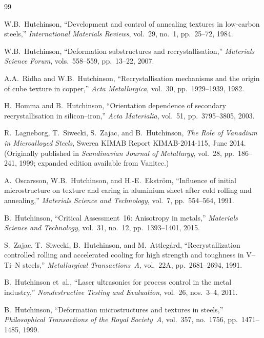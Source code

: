 \documentclass[11pt,a4paper]{article}
\begin{document}
\begin{thebibliography}{99}

W.B.~Hutchinson,
``Development and control of annealing textures in low-carbon steels,''
\emph{International Materials Reviews}, vol.~29, no.~1, pp.~25--72, 1984.

W.B.~Hutchinson,
``Deformation substructures and recrystallisation,''
\emph{Materials Science Forum}, vols.~558--559, pp.~13--22, 2007.

A.A.~Ridha and W.B.~Hutchinson,
``Recrystallisation mechanisms and the origin of cube texture in copper,''
\emph{Acta Metallurgica}, vol.~30, pp.~1929--1939, 1982.

H.~Homma and B.~Hutchinson,
``Orientation dependence of secondary recrystallisation in silicon--iron,''
\emph{Acta Materialia}, vol.~51, pp.~3795--3805, 2003.

R.~Lagneborg, T.~Siwecki, S.~Zajac, and B.~Hutchinson,
\emph{The Role of Vanadium in Microalloyed Steels},
Swerea KIMAB Report KIMAB-2014-115, June 2014.
(Originally published in \emph{Scandinavian Journal of Metallurgy},
vol.~28, pp.~186--241, 1999; expanded edition available from Vanitec.)

A.~Oscarsson, W.B.~Hutchinson, and H.-E.~Ekstr\"om,
``Influence of initial microstructure on texture and earing in aluminium
sheet after cold rolling and annealing,''
\emph{Materials Science and Technology}, vol.~7, pp.~554--564, 1991.

B.~Hutchinson,
``Critical Assessment~16: Anisotropy in metals,''
\emph{Materials Science and Technology}, vol.~31, no.~12,
pp.~1393--1401, 2015.

S.~Zajac, T.~Siwecki, B.~Hutchinson, and M.~Attleg\aa{}rd,
``Recrystallization controlled rolling and accelerated cooling for high
strength and toughness in V--Ti--N steels,''
\emph{Metallurgical Transactions~A}, vol.~22A, pp.~2681--2694, 1991.

B.~Hutchinson et~al.,
``Laser ultrasonics for process control in the metal industry,''
\emph{Nondestructive Testing and Evaluation}, vol.~26, nos.~3--4, 2011.

B.~Hutchinson,
``Deformation microstructures and textures in steels,''
\emph{Philosophical Transactions of the Royal Society~A}, vol.~357,
no.~1756, pp.~1471--1485, 1999.


\end{thebibliography}
\end{document}
